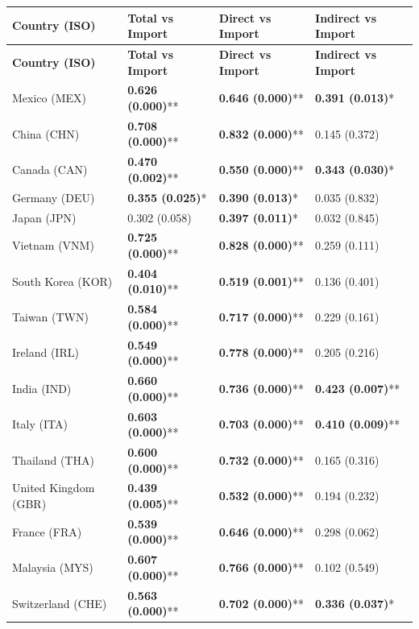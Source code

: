 \begin{longtable}{p{4cm}p{3cm}p{3cm}p{3cm}}
\toprule
\textbf{Country (ISO)} & \textbf{Total vs Import} & \textbf{Direct vs Import} & \textbf{Indirect vs Import} \\
\midrule
\endfirsthead

\toprule
\textbf{Country (ISO)} & \textbf{Total vs Import} & \textbf{Direct vs Import} & \textbf{Indirect vs Import} \\
\midrule
\endhead

\bottomrule
\endfoot

\bottomrule
\endlastfoot

Mexico (MEX) & \textbf{0.626 (0.000)}** & \textbf{0.646 (0.000)}** & \textbf{0.391 (0.013)}* \\
China (CHN) & \textbf{0.708 (0.000)}** & \textbf{0.832 (0.000)}** & 0.145 (0.372) \\
Canada (CAN) & \textbf{0.470 (0.002)}** & \textbf{0.550 (0.000)}** & \textbf{0.343 (0.030)}* \\
Germany (DEU) & \textbf{0.355 (0.025)}* & \textbf{0.390 (0.013)}* & 0.035 (0.832) \\
Japan (JPN) & 0.302 (0.058) & \textbf{0.397 (0.011)}* & 0.032 (0.845) \\
Vietnam (VNM) & \textbf{0.725 (0.000)}** & \textbf{0.828 (0.000)}** & 0.259 (0.111) \\
South Korea (KOR) & \textbf{0.404 (0.010)}** & \textbf{0.519 (0.001)}** & 0.136 (0.401) \\
Taiwan (TWN) & \textbf{0.584 (0.000)}** & \textbf{0.717 (0.000)}** & 0.229 (0.161) \\
Ireland (IRL) & \textbf{0.549 (0.000)}** & \textbf{0.778 (0.000)}** & 0.205 (0.216) \\
India (IND) & \textbf{0.660 (0.000)}** & \textbf{0.736 (0.000)}** & \textbf{0.423 (0.007)}** \\
Italy (ITA) & \textbf{0.603 (0.000)}** & \textbf{0.703 (0.000)}** & \textbf{0.410 (0.009)}** \\
Thailand (THA) & \textbf{0.600 (0.000)}** & \textbf{0.732 (0.000)}** & 0.165 (0.316) \\
United Kingdom (GBR) & \textbf{0.439 (0.005)}** & \textbf{0.532 (0.000)}** & 0.194 (0.232) \\
France (FRA) & \textbf{0.539 (0.000)}** & \textbf{0.646 (0.000)}** & 0.298 (0.062) \\
Malaysia (MYS) & \textbf{0.607 (0.000)}** & \textbf{0.766 (0.000)}** & 0.102 (0.549) \\
Switzerland (CHE) & \textbf{0.563 (0.000)}** & \textbf{0.702 (0.000)}** & \textbf{0.336 (0.037)}* \\

\end{longtable}
